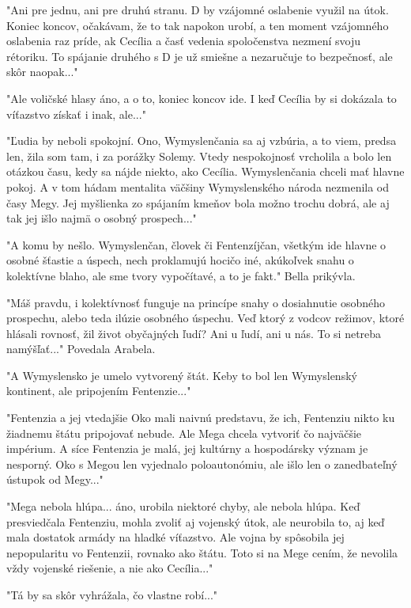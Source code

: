 \documentclass{book}
\begin{document}
"$ $Ani pre jednu, ani pre druhú stranu. D by vzájomné oslabenie využil na útok. Koniec koncov, očakávam, že to tak napokon urobí, a ten moment vzájomného oslabenia raz príde, ak Cecília a časť vedenia spoločenstva nezmení svoju rétoriku. To spájanie druhého s D je už smiešne a nezaručuje to bezpečnosť, ale skôr naopak..."$ $ 

"$ $Ale voličské hlasy áno, a o to, koniec koncov ide. I keď Cecília by si dokázala to víťazstvo získať i inak, ale..."$ $ 

"$ $Ľudia by neboli spokojní. Ono, Wymyslenčania sa aj vzbúria, a to viem, predsa len, žila som tam, i za porážky Solemy. Vtedy nespokojnosť vrcholila a bolo len otázkou času, kedy sa nájde niekto, ako Cecília. Wymyslenčania chceli mať hlavne pokoj. A v tom hádam mentalita väčšiny Wymyslenského národa nezmenila od časy Megy. Jej myšlienka zo spájaním kmeňov bola možno trochu dobrá, ale aj tak jej išlo najmä o osobný prospech..."$ $ 

"$ $A komu by nešlo. Wymyslenčan, človek či Fentenzíjčan, všetkým ide hlavne o osobné šťastie a úspech, nech proklamujú hocičo iné, akúkoľvek snahu o kolektívne blaho, ale sme tvory vypočítavé, a to je fakt."$ $  Bella prikývla.

"$ $Máš pravdu, i kolektívnosť funguje na princípe snahy o dosiahnutie osobného prospechu, alebo teda ilúzie osobného úspechu. Veď ktorý z vodcov režimov, ktoré hlásali rovnosť, žil život obyčajných ľudí? Ani u ľudí, ani u nás. To si netreba namýšľať..."$ $  Povedala Arabela.

"$ $A Wymyslensko je umelo vytvorený štát. Keby to bol len Wymyslenský kontinent, ale pripojením Fentenzie..."$ $ 

"$ $Fentenzia a jej vtedajšie Oko mali naivnú predstavu, že ich, Fentenziu nikto ku žiadnemu štátu pripojovať nebude. Ale Mega chcela vytvoriť čo najväčšie impérium. A síce Fentenzia je malá, jej kultúrny a hospodársky význam je nesporný. Oko s Megou len vyjednalo poloautonómiu, ale išlo len o zanedbateľný ústupok od Megy..."$ $ 

"$ $Mega nebola hlúpa... áno, urobila niektoré chyby, ale nebola hlúpa. Keď presviedčala Fentenziu, mohla zvoliť aj vojenský útok, ale neurobila to, aj keď mala dostatok armády na hladké víťazstvo. Ale vojna by spôsobila jej nepopularitu vo Fentenzii, rovnako ako štátu. Toto si na Mege cením, že nevolila vždy vojenské riešenie, a nie ako Cecília..."$ $ 

"$ $Tá by sa skôr vyhrážala, čo vlastne robí..."$ $ 
\end{document}
